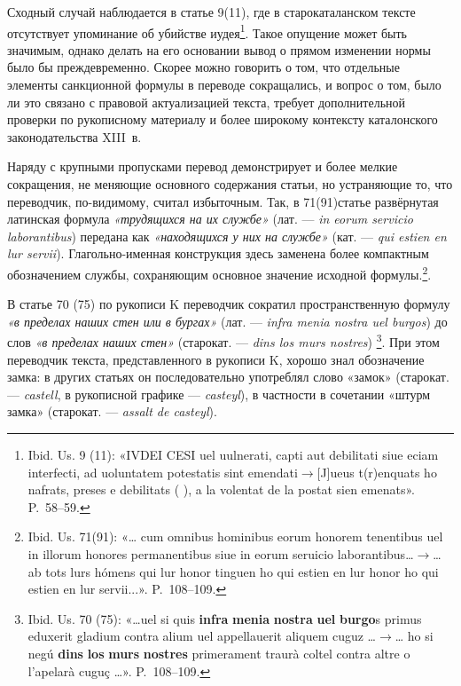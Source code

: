 Сходный случай наблюдается в статье 9(11), где в старокаталанском тексте отсутствует упоминание об убийстве иудея\footnote{Ibid. Us. 9 (11): «IVDEI CESI uel uulnerati, capti aut debilitati siue eciam interfecti, ad uoluntatem potestatis sint emendati$\rightarrow$[J]ueus t(r)enquats ho nafrats, preses e debilitats ( ), a la volentat de la postat sien emenats». P.~58--59.}. Такое опущение может быть значимым, однако делать на его основании вывод о прямом изменении нормы было бы преждевременно. Скорее можно говорить о том, что отдельные элементы санкционной формулы в переводе сокращались, и вопрос о том, было ли это связано с правовой актуализацией текста, требует дополнительной проверки по рукописному материалу и более широкому контексту каталонского законодательства XIII~в.

Наряду с крупными пропусками перевод демонстрирует и более мелкие сокращения, не меняющие основного содержания статьи, но устраняющие то, что переводчик, по-видимому, считал избыточным. Так, в 71(91)статье  развёрнутая латинская формула \emph{«трудящихся на их службе»} (лат. --- \emph{in eorum servicio laborantibus}) передана как \emph{«находящихся у них на службе»} (кат. --- \emph{qui estien en lur servii}). Глагольно-именная конструкция здесь заменена более компактным обозначением службы, сохраняющим основное значение исходной формулы.\footnote{Ibid. Us. 71(91): «… cum omnibus hominibus eorum honorem tenentibus uel in illorum honores  permanentibus siue in eorum seruicio laborantibus…$\rightarrow$…ab tots lurs hómens qui lur honor tinguen ho qui estien en lur honor ho qui estien en lur servii...». P.~108--109.}.

В статье 70 (75) по рукописи K переводчик сократил пространственную формулу \emph{«в пределах наших стен или в бургах»} (лат. --- \emph{infra menia nostra uel burgos}) до слов \emph{«в пределах наших стен» }(старокат. --- \emph{dins los murs nostres})\textsuperscript{ }\footnote{Ibid. Us. 70 (75): «…uel si quis\textbf{ }\textbf{infra}\textbf{ }\textbf{menia}\textbf{ }\textbf{nostra}\textbf{ }\textbf{uel}\textbf{ }\textbf{burgo}s primus eduxerit gladium contra alium uel appellauerit aliquem cuguz …$\rightarrow$… ho si negú \textbf{dins}\textbf{ }\textbf{los}\textbf{ }\textbf{murs}\textbf{ }\textbf{nostres} primerament traurà coltel contra altre o l’apelarà cuguç …». P.~108--109.}. При этом переводчик текста, представленного в рукописи K, хорошо знал обозначение замка: в других статьях он последовательно употреблял слово «замок» (старокат. --- \emph{castell}, в рукописной графике --- \emph{casteyl}), в частности в сочетании «штурм замка» (старокат. --- \emph{assalt de casteyl}).

